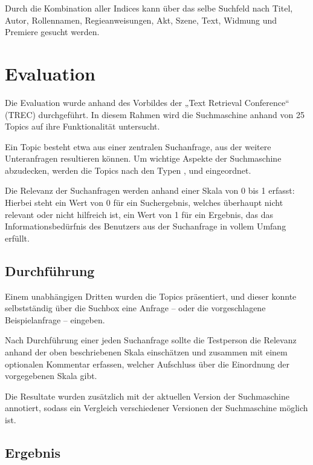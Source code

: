 Durch die Kombination aller Indices kann über das selbe Suchfeld nach
Titel, Autor, Rollennamen, Regieanweisungen, Akt, Szene,
Text, Widmung und Premiere gesucht werden.

\section{Evaluation}
Die Evaluation wurde anhand des Vorbildes der
„Text Retrieval Conference“ (TREC) durchgeführt.
In diesem Rahmen wird die Suchmaschine anhand von 25 Topics
auf ihre Funktionalität untersucht.

Ein Topic besteht etwa aus einer zentralen Suchanfrage,
aus der weitere Unteranfragen resultieren können.
Um wichtige Aspekte der Suchmaschine abzudecken,
werden die Topics nach den Typen ,
 und  eingeordnet.

Die Relevanz der Suchanfragen werden anhand einer Skala von 0 bis 1 erfasst:
Hierbei steht ein Wert von 0 für ein Suchergebnis,
welches überhaupt nicht relevant oder nicht hilfreich ist,
ein Wert von 1 für ein Ergebnis, das das Informationsbedürfnis des Benutzers
aus der Suchanfrage in vollem Umfang erfüllt.

\subsection{Durchführung}

Einem unabhängigen Dritten wurden die Topics präsentiert,
und dieser konnte selbstständig über die Suchbox
eine Anfrage -- oder die vorgeschlagene Beispielanfrage -- eingeben.

Nach Durchführung einer jeden Suchanfrage sollte die Testperson
die Relevanz anhand der oben beschriebenen Skala einschätzen
und zusammen mit einem optionalen Kommentar erfassen,
welcher Aufschluss über die Einordnung der vorgegebenen Skala gibt.

Die Resultate wurden zusätzlich
mit der aktuellen Version der Suchmaschine annotiert,
sodass ein Vergleich verschiedener Versionen der Suchmaschine möglich ist.

\subsection{Ergebnis}

